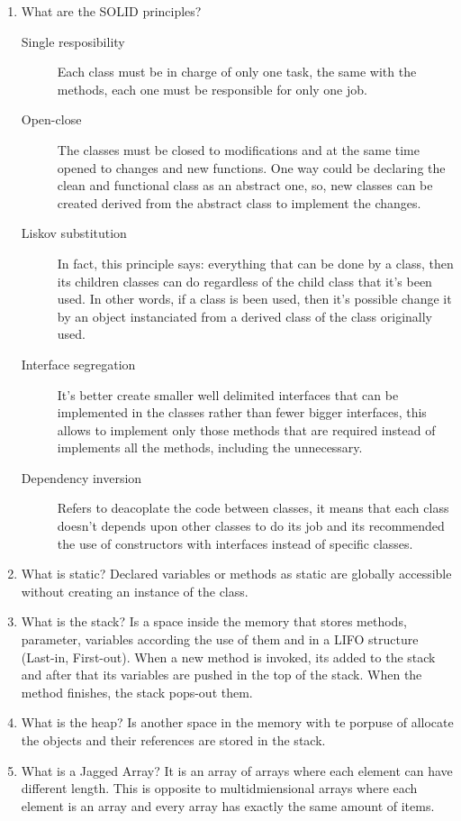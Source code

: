 \begin{multicols}{2}
\begin{enumerate}
\item What are the SOLID principles?
\begin{description}
\item[Single resposibility] Each class must be in charge of only one task, the same with the methods, each one must be responsible for only one job.
\item[Open-close]  The classes must be closed to modifications and at the same time opened to changes and new functions. One way could be declaring the clean and functional class as an abstract one, so, new classes can be created derived from the abstract class to implement the changes.
\item[Liskov substitution] In fact, this principle says: everything that can be done by a class, then its children classes can do regardless of the child class that it's been used. In other words, if a class is been used, then it's possible change it by an object instanciated from a derived class of the class originally used.
\item[Interface segregation] It's better create smaller well delimited interfaces that can be implemented in the classes rather than fewer bigger interfaces, this allows to implement only those methods that are required instead of implements all the methods, including the unnecessary.
\item[Dependency inversion] Refers to deacoplate the code between classes, it means that each class doesn't depends upon other classes to do its job and its recommended the use of constructors with interfaces instead of specific classes.
\end{description}
\item What is static? Declared variables or methods as static are globally accessible without creating an instance of the class.
\item What is the stack? Is a space inside the memory that stores methods, parameter, variables according the use of them and in a LIFO structure (Last-in, First-out). When a new method is invoked, its added to the stack and after that its variables are pushed in the top of the stack. When the method finishes, the stack pops-out them.
\item What is the heap? Is another space in the memory with te porpuse of allocate the objects and their references are stored in the stack.
\item What is a Jagged Array? It is an array of arrays where each element can have different length. This is opposite to multidmiensional arrays where each element is an array and every array has exactly the same amount of items.

\end{enumerate}
\end{multicols}
